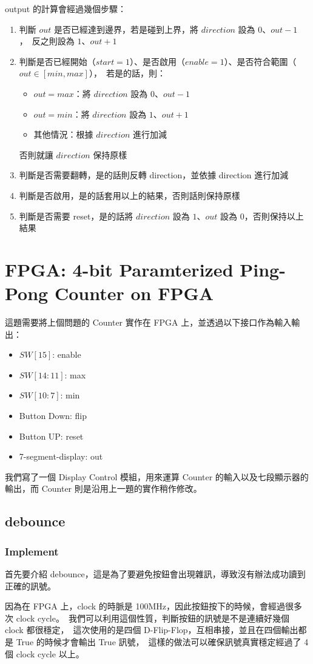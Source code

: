 \documentclass[10.5pt,compsoc,UTF8]{CjC}
\theoremstyle{mystyle}
\begin{document}
output 的計算會經過幾個步驟：
\begin{enumerate}
  \item 判斷 $out$ 是否已經達到邊界，若是碰到上界，將 $direction$ 設為 $0$、$out - 1$，\
  反之則設為 $1$、$out + 1$
  \item 判斷是否已經開始（$start = 1$）、是否啟用（$enable = 1$）、是否符合範圍（$out \in [min, max]$），\
  若是的話，則：
  \begin{itemize}
    \item $out = max$：將 $direction$ 設為 $0$、$out - 1$
    \item $out = min$：將 $direction$ 設為 $1$、$out + 1$
    \item 其他情況：根據 $direction$ 進行加減
  \end{itemize}
  否則就讓 $direction$ 保持原樣
  \item 判斷是否需要翻轉，是的話則反轉 direction，並依據 direction 進行加減
  \item 判斷是否啟用，是的話套用以上的結果，否則話則保持原樣
  \item 判斷是否需要 reset，是的話將 $direction$ 設為 $1$、$out$ 設為 $0$，否則保持以上結果
\end{enumerate}


\section{FPGA: 4-bit Paramterized Ping-Pong Counter on FPGA}

這題需要將上個問題的 Counter 實作在 FPGA 上，並透過以下接口作為輸入輸出：
\begin{itemize}
  \item $SW[15]$: enable
  \item $SW[14:11]$: max
  \item $SW[10:7]$: min
  \item Button Down: flip
  \item Button UP: reset
  \item 7-segment-display: out
\end{itemize}


我們寫了一個 Display Control 模組，用來運算 Counter 的輸入以及七段顯示器的輸出，而 Counter 則是沿用上一題的實作稍作修改。

\subsection{debounce}
\subsubsection*{Implement}
首先要介紹 debounce，這是為了要避免按鈕會出現雜訊，導致沒有辦法成功讀到正確的訊號。\
\par
因為在 FPGA 上，clock 的時脈是 100MHz，因此按鈕按下的時候，會經過很多次 clock cycle。\
我們可以利用這個性質，判斷按鈕的訊號是不是連續好幾個 clock 都很穩定，\
這次使用的是四個 D-Flip-Flop，互相串接，並且在四個輸出都是 True 的時候才會輸出 True 訊號，\
這樣的做法可以確保訊號真實穩定經過了 4 個 clock cycle 以上。
\end{document}
